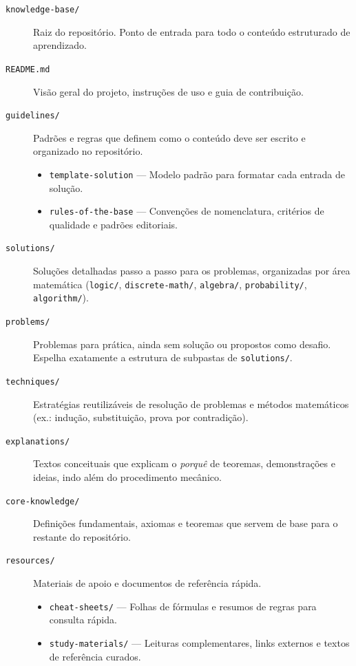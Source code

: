 \documentclass[12pt, a4paper]{article}
\begin{document}
\begin{description}
  \item[\texttt{knowledge-base/}]
    Raiz do repositório. Ponto de entrada para todo o conteúdo estruturado de aprendizado.

  \item[\texttt{README.md}]
    Visão geral do projeto, instruções de uso e guia de contribuição.

  \item[\texttt{guidelines/}]
    Padrões e regras que definem como o conteúdo deve ser escrito e organizado no
    repositório.
    \begin{itemize}
      \item \texttt{template-solution} --- Modelo padrão para formatar cada entrada de
        solução.
      \item \texttt{rules-of-the-base} --- Convenções de nomenclatura, critérios de
        qualidade e padrões editoriais.
    \end{itemize}

  \item[\texttt{solutions/}]
    Soluções detalhadas passo a passo para os problemas, organizadas por área matemática
    (\texttt{logic/}, \texttt{discrete-math/}, \texttt{algebra/}, \texttt{probability/},
    \texttt{algorithm/}).

  \item[\texttt{problems/}]
    Problemas para prática, ainda sem solução ou propostos como desafio. Espelha exatamente
    a estrutura de subpastas de \texttt{solutions/}.

  \item[\texttt{techniques/}]
    Estratégias reutilizáveis de resolução de problemas e métodos matemáticos (ex.:
    indução, substituição, prova por contradição).

  \item[\texttt{explanations/}]
    Textos conceituais que explicam o \emph{porquê} de teoremas, demonstrações e ideias,
    indo além do procedimento mecânico.

  \item[\texttt{core-knowledge/}]
    Definições fundamentais, axiomas e teoremas que servem de base para o restante
    do repositório.

  \item[\texttt{resources/}]
    Materiais de apoio e documentos de referência rápida.
    \begin{itemize}
      \item \texttt{cheat-sheets/} --- Folhas de fórmulas e resumos de regras para
        consulta rápida.
      \item \texttt{study-materials/} --- Leituras complementares, links externos e textos
        de referência curados.
    \end{itemize}
\end{description}
\end{document}
